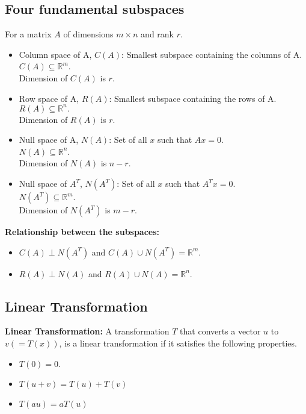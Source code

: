 \subsection{Four fundamental subspaces}
For a matrix $A$ of dimensions $m \times n$ and rank $r$.
\begin{itemize}
	\item Column space of A, $C(A)$: Smallest subspace containing the columns of A.\\
	$C(A) \subseteq \mathbb{R}^m$.\\
	Dimension of $C(A)$ is $r$.
	\item Row space of A, $R(A)$: Smallest subspace containing the rows of A.\\
	$R(A) \subseteq \mathbb{R}^n.$\\ 
	Dimension of $R(A)$ is $r$.
	\item Null space of A, $N(A)$: Set of all $x$ such that $Ax = 0$.\\
	$N(A) \subseteq \mathbb{R}^n$.\\
	Dimension of $N(A)$ is $n-r$.
	\item Null space of $A^T$, $N(A^T)$: Set of all $x$ such that $A^Tx = 0$.\\
	$N(A^T) \subseteq \mathbb{R}^m$.\\
	Dimension of $N(A^T)$ is $m-r$.
\end{itemize}

\textbf{Relationship between the subspaces:}
\begin{itemize}
	\item $C(A) \perp N(A^T)$ and $C(A) \cup N(A^T) = \mathbb{R}^m$.
	\item $R(A) \perp N(A)$ and $R(A) \cup N(A) = \mathbb{R}^n$.
\end{itemize}


\subsection{Linear Transformation}

\textbf{Linear Transformation:} A transformation $T$ that converts a vector $u$ to $v (= T(x))$, is a linear transformation if it satisfies the following properties.
\begin{itemize}
	\item $T(0) = 0$.
	\item $T(u + v) = T(u) + T(v)$
	\item $T(au) = aT(u)$
\end{itemize}


